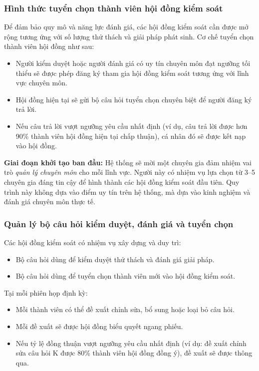 \subsubsection{Hình thức tuyển chọn thành viên hội đồng kiểm soát}

Để đảm bảo quy mô và năng lực đánh giá, các hội đồng kiểm soát cần được mở rộng tương ứng với số lượng thử thách và giải pháp phát sinh. Cơ chế tuyển chọn thành viên hội đồng như sau:

\begin{itemize}
  \item Người kiểm duyệt hoặc người đánh giá có uy tín chuyên môn đạt ngưỡng tối thiểu sẽ được phép đăng ký tham gia hội đồng kiểm soát tương ứng với lĩnh vực chuyên môn.
  \item Hội đồng hiện tại sẽ gửi bộ câu hỏi tuyển chọn chuyên biệt để người đăng ký trả lời.
  \item Nếu câu trả lời vượt ngưỡng yêu cầu nhất định (ví dụ, câu trả lời được hơn 90\% thành viên hội đồng hiện tại chấp thuận), cá nhân đó sẽ được kết nạp vào hội đồng.
\end{itemize}

\textbf{Giai đoạn khởi tạo ban đầu:} Hệ thống sẽ mời một chuyên gia đảm nhiệm vai trò \textit{quản lý chuyên môn} cho mỗi lĩnh vực. Người này có nhiệm vụ lựa chọn từ 3--5 chuyên gia đáng tin cậy để hình thành các hội đồng kiểm soát đầu tiên.
Quy trình này không dựa vào điểm uy tín trên hệ thống, mà dựa vào kinh nghiệm và đánh giá chuyên môn thực tế.

\subsubsection{Quản lý bộ câu hỏi kiểm duyệt, đánh giá và tuyển chọn}

Các hội đồng kiểm soát có nhiệm vụ xây dựng và duy trì:
\begin{itemize}
  \item Bộ câu hỏi dùng để kiểm duyệt thử thách và đánh giá giải pháp.
  \item Bộ câu hỏi dùng để tuyển chọn thành viên mới vào hội đồng kiểm soát.
\end{itemize}

Tại mỗi phiên họp định kỳ:
\begin{itemize}
  \item Mỗi thành viên có thể đề xuất chỉnh sửa, bổ sung hoặc loại bỏ câu hỏi.
  \item Mỗi đề xuất sẽ được hội đồng biểu quyết ngang phiếu.
  \item Nếu tỷ lệ đồng thuận vượt ngưỡng yêu cầu nhất định (ví dụ: đề xuất chỉnh sửa câu hỏi K được 80\% thành viên hội đồng đồng ý), đề xuất sẽ được thông qua.
\end{itemize}

